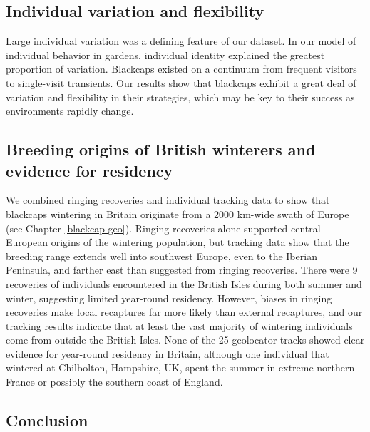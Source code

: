 \documentclass[a4paper, nobind]{templates/ociamthesis}
\begin{document}
\hypertarget{individual-variation-and-flexibility}{%
\subsection{Individual variation and flexibility}\label{individual-variation-and-flexibility}}

Large individual variation was a defining feature of our dataset. In our model of individual behavior in gardens, individual identity explained the greatest proportion of variation. Blackcaps existed on a continuum from frequent visitors to single-visit transients. Our results show that blackcaps exhibit a great deal of variation and flexibility in their strategies, which may be key to their success as environments rapidly change.

\hypertarget{breeding-origins-of-british-winterers-and-evidence-for-residency}{%
\subsection{Breeding origins of British winterers and evidence for residency}\label{breeding-origins-of-british-winterers-and-evidence-for-residency}}

We combined ringing recoveries and individual tracking data to show that blackcaps wintering in Britain originate from a 2000 km-wide swath of Europe (see Chapter \ref{blackcap-geo}). Ringing recoveries alone supported central European origins of the wintering population, but tracking data show that the breeding range extends well into southwest Europe, even to the Iberian Peninsula, and farther east than suggested from ringing recoveries. There were 9 recoveries of individuals encountered in the British Isles during both summer and winter, suggesting limited year-round residency. However, biases in ringing recoveries make local recaptures far more likely than external recaptures, and our tracking results indicate that at least the vast majority of wintering individuals come from outside the British Isles. None of the 25 geolocator tracks showed clear evidence for year-round residency in Britain, although one individual that wintered at Chilbolton, Hampshire, UK, spent the summer in extreme northern France or possibly the southern coast of England.

\hypertarget{conclusion-1}{%
\subsection{Conclusion}\label{conclusion-1}}
\end{document}
